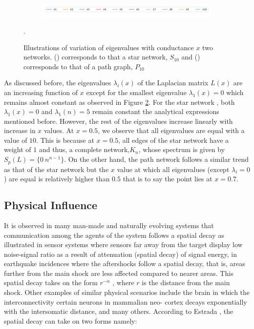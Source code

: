 \documentclass[10pt,a4paper]{article}
\begin{document}
\begin{figure}[H]
\begin{subfigure}[b]{0.45\textwidth}
    	    	 		\label{path-spectra}
    	    	 	\end{subfigure} \\
    	    	 	\begin{subfigure}[b]{0.85\textwidth}
    	    	 		\includegraphics[width= \textwidth]{images/legend-eigenvalues.png}
    	    	 	\end{subfigure}
    	    	 	\caption{Illustrations of variation of eigenvalues with conductance $x$ two networks.
    	    	 		() corresponds to that a star network, $S_{10}$ and  () corresponds to that of a path graph, $P_{10}$}.
    	    	 	\label{eigen-xvalues}
    	    	 \end{figure}
    	    	 As discussed before, the eigenvalues $\lambda_i(x)$ of the Laplacian matrix $L(x)$ are an increasing function of $x$ except for the smallest eigenvalue $\lambda_1(x) = 0$ which remains almost constant as observed in Figure \ref{eigen-xvalues}. For the star network , both $\lambda_1(x) = 0$ and $\lambda_1(n) = 5$ remain constant the analytical expressions mentioned before. However, the rest of the eigenvalues increase linearly with increase in $x$ values. At $x=0.5$, we observe that all eigenvalues are equal with a value of $10$. This is because at $x=0.5$, all edges of the star network have a weight of $1$ and thus, a complete network,$K_n$, whose spectrum is given by $S_p(L) = \{0~ n^{n-1} \}$. On the other hand, the path network follows a similar trend as that of the star network but the $x$ value at which all eigenvalues (except $\lambda_i=0$) are equal is relatively higher than $0.5$ that is to say the point lies at $x=0.7$. 
    	    	
    	    	\subsection{Physical Influence}
    	    	It is observed in many man-made and naturally evolving systems that communication among the agents of the system follows a spatial decay as illustrated in sensor systems where sensors far away from the target display low noise-signal ratio as a result of attenuation (spatial decay) of signal energy, in earthquake incidences where the aftershocks follow a spatial decay, that is, areas further from the main shock are less affected compared to nearer areas. This spatial decay takes on the form $r ^{-\alpha}$ , where $r$ is the distance from the main shock. Other examples of similar physical scenarios include the brain in which the interconnectivity certain neurons in mammalian neo-
    	    	cortex decays exponentially with the intersomatic distance, and many others.
    	    	According to Estrada \citep{estrada2012path}, the spatial decay can take on two forms namely:
    	    	
\end{document}
